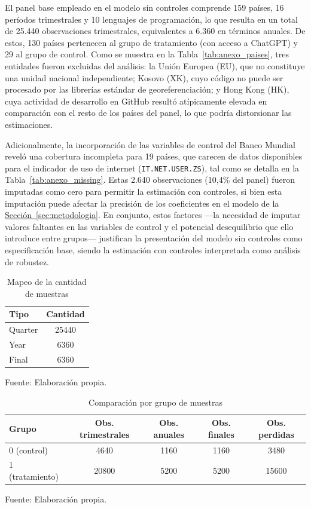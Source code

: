 \documentclass[12pt,a4paper]{article}
\begin{document}
El panel base empleado en el modelo sin controles comprende 159 países, 16 períodos trimestrales y 10 lenguajes de programación, lo que resulta en un total de 25.440 observaciones trimestrales, equivalentes a 6.360 en términos anuales. De estos, 130 países pertenecen al grupo de tratamiento (con acceso a ChatGPT) y 29 al grupo de control. Como se muestra en la Tabla~\ref{tab:anexo_paises}, tres entidades fueron excluidas del análisis: la Unión Europea (EU), que no constituye una unidad nacional independiente; Kosovo (XK), cuyo código no puede ser procesado por las librerías estándar de georeferenciación; y Hong Kong (HK), cuya actividad de desarrollo en GitHub resultó atípicamente elevada en comparación con el resto de los países del panel, lo que podría distorsionar las estimaciones.

Adicionalmente, la incorporación de las variables de control del Banco Mundial reveló una cobertura incompleta para 19 países, que carecen de datos disponibles para el indicador de uso de internet (\texttt{IT.NET.USER.ZS}), tal como se detalla en la Tabla~\ref{tab:anexo_missing}. Estas 2.640 observaciones (10,4\% del panel) fueron imputadas como cero para permitir la estimación con controles, si bien esta imputación puede afectar la precisión de los coeficientes en el modelo de la \hyperref[sec:metodologia]{Sección~\ref*{sec:metodologia}}. En conjunto, estos factores —la necesidad de imputar valores faltantes en las variables de control y el potencial desequilibrio que ello introduce entre grupos— justifican la presentación del modelo sin controles como especificación base, siendo la estimación con controles interpretada como análisis de robustez.



\begin{table}[H]
\centering
\caption{Mapeo de la cantidad de muestras}
\label{tab:tabla8}
\begin{tabular}{lc}
\toprule
Tipo & Cantidad \\
\midrule
Quarter & 25440 \\
Year & 6360 \\
Final & 6360 \\
\bottomrule
\end{tabular}
\begin{minipage}{\linewidth}\smallskip\footnotesize Fuente: Elaboración propia.\end{minipage}
\end{table}


\begin{table}[H]
\centering
\caption{Comparación por grupo de muestras}
\label{tab:tabla9}
\begin{tabular}{lcccc}
\toprule
Grupo & Obs. trimestrales & Obs. anuales & Obs. finales & Obs. perdidas \\
\midrule
0 (control) & 4640 & 1160 & 1160 & 3480 \\
1 (tratamiento) & 20800 & 5200 & 5200 & 15600 \\
\bottomrule
\end{tabular}
\begin{minipage}{\linewidth}\smallskip\footnotesize Fuente: Elaboración propia.\end{minipage}
\end{table}
\end{document}
